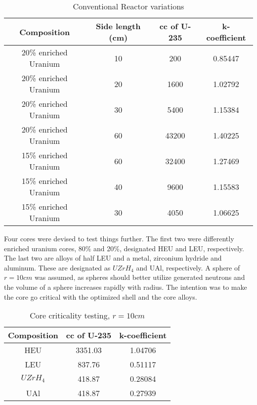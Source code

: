 \begin{table}[!htbp]
\centering
\caption{Conventional Reactor variations}
\label{tab:variations}
\begin{tabular}{|c|c|c|c|}
\hline
Composition            & Side length (cm)	& cc of U-235	& k-coefficient \\
\hline
20\% enriched Uranium  & 10               	&   200			& 0.85447       \\
\hline
20\% enriched Uranium  & 20               	&  1600			& 1.02792       \\
\hline
20\% enriched Uranium  & 30               	&  5400			& 1.15384       \\
\hline
20\% enriched Uranium  & 60               	& 43200			& 1.40225       \\
\hline
15\% enriched Uranium  & 60               	& 32400			& 1.27469       \\
\hline
15\% enriched Uranium  & 40               	&  9600			& 1.15583       \\
\hline
15\% enriched Uranium  & 30               	&  4050			& 1.06625       \\
\hline
\end{tabular}
\end{table}

Four cores were devised to test things further. The first two were differently enriched uranium cores, 80\% and 20\%, designated HEU and LEU, respectively. The last two are alloys of half LEU and a metal, zirconium hydride and aluminum. These are designated as $UZrH_4$ and UAl, respectively. A sphere of $r=10cm$ was assumed, as spheres should better utilize generated neutrons and the volume of a sphere increases rapidly with radius. The intention was to make the core go critical with the optimized shell and the core alloys.


\begin{table}[!htbp]
\centering
\caption{Core criticality testing, $r=10cm$}
\label{tab:kcore}
\begin{tabular}{|c|c|c|}
\hline
Composition		& cc of U-235		& k-coefficient \\
\hline
HEU	  	        & 3351.03           & 1.04706       \\
\hline
LEU				&  837.76           & 0.51117       \\
\hline
$UZrH_4$ 		&  418.87           & 0.28084       \\
\hline
UAl 			&  418.87           & 0.27939       \\
\hline
\end{tabular}
\end{table}

